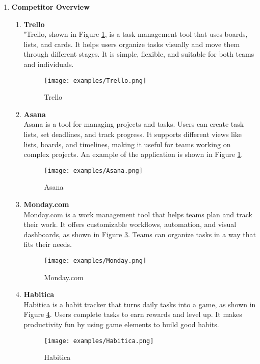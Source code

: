 \begin{enumerate}

    \item \textbf{Competitor Overview}
    \begin{enumerate}
        \item \textbf{Trello} \\
        "Trello, shown in Figure \ref{fig:Trello}, is a task management tool that uses boards, lists, and cards. It helps users organize tasks visually and move them through different stages. It is simple, flexible, and suitable for both teams and individuals.
        \begin{figure}[H]
            \centering
            \texttt{[image: examples/Trello.png]}
            \caption{Trello}
            \label{fig:Trello}
        \end{figure}

        \item \textbf{Asana} \\
        Asana is a tool for managing projects and tasks. Users can create task lists, set deadlines, and track progress. It supports different views like lists, boards, and timelines, making it useful for teams working on complex projects. An example of the application is shown in Figure \ref{fig:Trello}.
        \begin{figure}[H]
            \centering
            \texttt{[image: examples/Asana.png]}
            \caption{Asana}
            \label{fig:Asana}
        \end{figure}

        \item \textbf{Monday.com} \\
        Monday.com is a work management tool that helps teams plan and track their work. It offers customizable workflows, automation, and visual dashboards, as shown in Figure \ref{fig:Monday}. Teams can organize tasks in a way that fits their needs.
        \begin{figure}[H]
            \centering
            \texttt{[image: examples/Monday.png]}
            \caption{Monday.com}
            \label{fig:Monday}
    \end{figure}

    \item \textbf{Habitica} \\
    Habitica is a habit tracker that turns daily tasks into a game, as shown in Figure \ref{fig:Habitica}. Users complete tasks to earn rewards and level up. It makes productivity fun by using game elements to build good habits.
    \begin{figure}[H]
        \centering
        \texttt{[image: examples/Habitica.png]}
        \caption{Habitica}
        \label{fig:Habitica}
    \end{figure}


\end{enumerate}
\end{enumerate}
